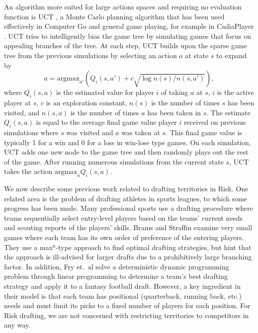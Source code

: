 \documentclass[letterpaper]{article}
\numberwithin{equation}{section}
\numberwithin{theorem}{section}
\numberwithin{lemma}{section}
\numberwithin{df}{section}
\begin{document}
An algorithm more suited for large actions spaces and requiring no evaluation function is UCT \cite{UCT}, a Monte Carlo planning algorithm that has been used effectively in Computer Go \cite{ComputerGo} and general game playing, for example in CadiaPlayer \cite{Cadia}.  UCT tries to intelligently bias the game tree by simulating games that focus on appealing branches of the tree.  At each step, UCT builds upon the sparse game tree from the previous simulations by selecting an action $a$ at state $s$ to expand by
\[ a = \text{argmax}_{a'} \left( Q_i(s,a') + c \sqrt{ \log n(s) / n(s,a') } \right), \]
where $Q_i(s,a)$ is the estimated value for player $i$ of taking $a$ at $s$, $i$ is the active player at $s$, $c$ is an exploration constant, $n(s)$ is the number of times $s$ has been visited, and $n(s,a)$ is the number of times $a$ has been taken in $s$.  The estimate $Q_i(s,a)$ is equal to the average final game value player $i$ received on previous simulations where $s$ was visited and $a$ was taken at $s$.  This final game value is typically 1 for a win and 0 for a loss in win-lose type games.  On each simulation, UCT adds one new node to the game tree and then randomly plays out the rest of the game.  After running numerous simulations from the current state $s$, UCT takes the action $\text{argmax}_{a}Q_i(s,a)$.

We now describe some previous work related to drafting territories in Risk.  One related area is the problem of drafting athletes in sports leagues, to which some progress has been made.  Many professional sports use a drafting procedure where teams sequentially select entry-level players based on the teams' current needs and scouting reports of the players' skills.  Brams and Straffin \cite{PrisonAndDrafting} examine very small games where each team has its own order of preference of the entering players.  They use a max$^\text{n}$-type approach to find optimal drafting strategies, but hint that the approach is ill-advised for larger drafts due to a prohibitively large branching factor.  In addition, Fry et.~al \cite{SportsDrafting} solve a deterministic dynamic programming problem through linear programming to determine a team's best drafting strategy and apply it to a fantasy football draft.  However, a key ingredient in their model is that each team has positional (quarterback, running back, etc.) needs and must limit its picks to a fixed number of players for each position.  For Risk drafting, we are not concerned with restricting territories to competitors in any way.
\end{document}
